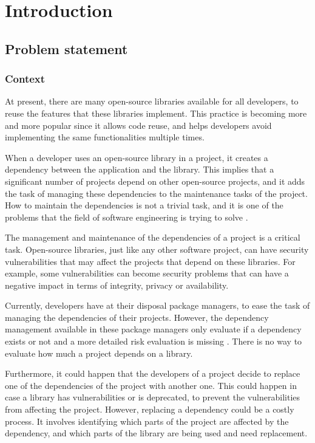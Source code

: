 \chapter{Introduction}\label{ch:Introduction}

\section{Problem statement}

\subsection{Context}
At present, there are many open-source libraries available for all developers, to reuse the features that these libraries implement. This practice is becoming more and more popular since it allows code reuse, and helps developers avoid implementing the same functionalities multiple times.

When a developer uses an open-source library in a project, it creates a dependency between the application and the library. This implies that a significant number of projects depend on other open-source projects, and it adds the task of managing these dependencies to the maintenance tasks of the project. How to maintain the dependencies is not a trivial task, and it is one of the problems that the field of software engineering is trying to solve \cite{kula2014visualizing}.

The management and maintenance of the dependencies of a project is a critical task. Open-source libraries, just like any other software project, can have security vulnerabilities that may affect the projects that depend on these libraries. For example, some vulnerabilities can become security problems that can have a negative impact in terms of integrity, privacy or availability.

\blankl
Currently, developers have at their disposal package managers, to ease the task of managing the dependencies of their projects. However, the dependency management available in these package managers only evaluate if a dependency exists or not and a more detailed risk evaluation is missing \cite{hejderup2018prazi}. There is no way to evaluate how much a project depends on a library.

Furthermore, it could happen that the developers of a project decide to replace one of the dependencies of the project with another one. This could happen in case a library has vulnerabilities or is deprecated, to prevent the vulnerabilities from affecting the project. However, replacing a dependency could be a costly process. It involves identifying which parts of the project are affected by the dependency, and which parts of the library are being used and need replacement.

